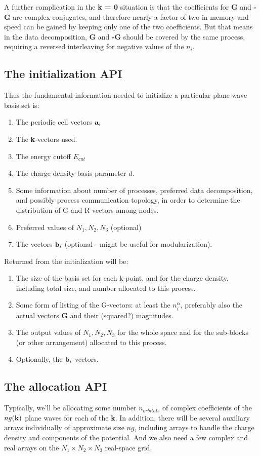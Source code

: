 A further complication in the {\bf k = 0} situation is that the
coefficients for {\bf G} and {\bf -G} are complex conjugates, and therefore
nearly a factor of two in memory and speed can be gained by keeping only
one of the two coefficients. But that means in the data decomposition,
{\bf G} and {\bf -G} should be covered by the same process, requiring
a reversed interleaving for negative values of the $n_i$.

\subsection{The initialization API}
Thus the fundamental information needed to initialize a particular plane-wave
basis set is:
\begin{enumerate}
\item The periodic cell vectors ${\bf a}_i$
\item The {\bf k}-vectors used.
\item The energy cutoff $E_{cut}$
\item The charge density basis parameter $d$.
\item Some information about number of processes, preferred data
decomposition, and possibly process communication topology, in order
to determine the distribution of G and R vectors among nodes.
\item Preferred values of $N_1, N_2, N_3$ (optional)
\item The vectors ${\bf b}_i$ (optional - might be useful
for modularization).
\end{enumerate}

Returned from the initialization will be:
\begin{enumerate}
\item The size of the basis set for each k-point, and for the charge
density, including total size, and number allocated to this process.
\item Some form of listing of the G-vectors: at least the $n^{\alpha}_i$,
preferably also the actual vectors {\bf G} and their (squared?) magnitudes.
\item The output values of $N_1, N_2, N_3$ for the whole space and
for the sub-blocks (or other arrangement) allocated to this process.
\item Optionally, the ${\bf b}_i$ vectors.
\end{enumerate}

\subsection{The allocation API}
Typically, we'll be allocating some number $n_{orbitals}$ of
complex coefficients of the $ng({\bf k})$ plane waves for each of
the {\bf k}. In addition, there will be several auxiliary arrays
individually of approximate size $ng$, including arrays to handle
the charge density and components of the potential. And we also need
a few complex and real arrays on the $N_1\times N_2 \times N_3$
real-space grid.


